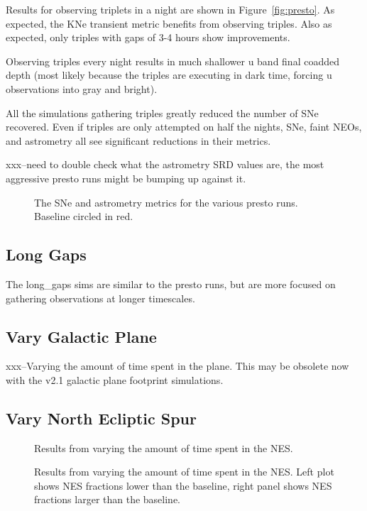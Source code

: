 Results for observing triplets in a night are shown in Figure~\ref{fig:presto}. As expected, the KNe transient metric benefits from observing triples. Also as expected, only triples with gaps of 3-4 hours show improvements.  

Observing triples every night results in much shallower u band final coadded depth (most likely because the triples are executing in dark time, forcing u observations into gray and bright). 

All the simulations gathering triples greatly reduced the number of SNe recovered. Even if triples are only attempted on half the nights, SNe, faint NEOs, and astrometry all see significant reductions in their metrics.


xxx--need to double check what the astrometry SRD values are, the most aggressive presto runs might be bumping up against it.

\begin{figure}
\caption{The SNe and astrometry metrics for the various presto runs. Baseline circled in red. \label{fig:presto_metics} }
\end{figure}

\subsection{Long Gaps}

The long\_gaps sims are similar to the presto runs, but are more focused on gathering observations at longer timescales.

\subsection{Vary Galactic Plane}

xxx--Varying the amount of time spent in the plane. This may be obsolete now with the v2.1 galactic plane footprint simulations. 


\subsection{Vary North Ecliptic Spur}

\begin{figure}
\caption{Results from varying the amount of time spent in the NES. \label{fig:vary_nes}}
\end{figure}

\begin{figure}
\caption{Results from varying the amount of time spent in the NES. Left plot shows NES fractions lower than the baseline, right panel shows NES fractions larger than the baseline.\label{fig:vary_nes}}
\end{figure}


